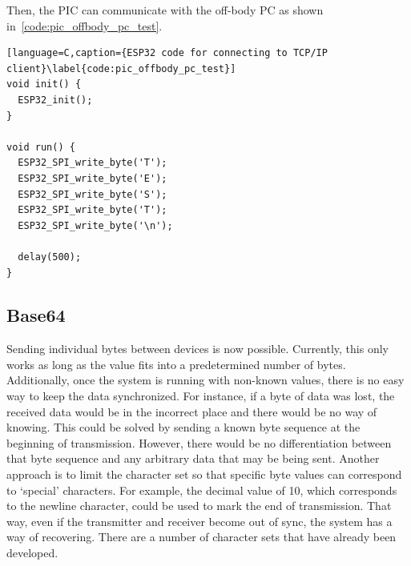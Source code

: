 Then, the PIC can communicate with the off-body PC as shown in~\autoref{code:pic_offbody_pc_test}.

\begin{lstlisting}[language=C,caption={ESP32 code for connecting to TCP/IP client}\label{code:pic_offbody_pc_test}]
void init() {
  ESP32_init();
}

void run() {
  ESP32_SPI_write_byte('T');
  ESP32_SPI_write_byte('E');
  ESP32_SPI_write_byte('S');
  ESP32_SPI_write_byte('T');
  ESP32_SPI_write_byte('\n');

  delay(500);
}
\end{lstlisting}

\subsection{Base64}
Sending individual bytes between devices is now possible.
Currently, this only works as long as the value fits into a predetermined number of bytes.
Additionally, once the system is running with non-known values, there is no easy way to keep the data synchronized.
For instance, if a byte of data was lost, the received data would be in the incorrect place
and there would be no way of knowing.
This could be solved by sending a known byte sequence at the beginning of transmission.
However, there would be no differentiation between that byte sequence and any arbitrary data that may be being sent.
Another approach is to limit the character set so that specific byte values can correspond to `special' characters.
For example, the decimal value of 10, which corresponds to the newline character, could be used to mark the end of transmission.
That way, even if the transmitter and receiver become out of sync, the system has a way of recovering.
There are a number of character sets that have already been developed.

